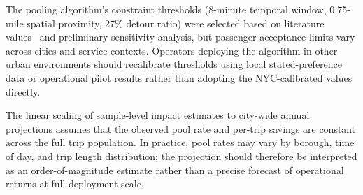 The pooling algorithm's constraint thresholds (8-minute temporal window, 0.75-mile spatial proximity, 27\% detour ratio) were selected based on literature values~\parencite{furuhata2013ridesharing,tang2018joint} and preliminary sensitivity analysis, but passenger-acceptance limits vary across cities and service contexts. Operators deploying the algorithm in other urban environments should recalibrate thresholds using local stated-preference data or operational pilot results rather than adopting the NYC-calibrated values directly.

The linear scaling of sample-level impact estimates to city-wide annual projections assumes that the observed pool rate and per-trip savings are constant across the full trip population. In practice, pool rates may vary by borough, time of day, and trip length distribution; the projection should therefore be interpreted as an order-of-magnitude estimate rather than a precise forecast of operational returns at full deployment scale.

\FloatBarrier
